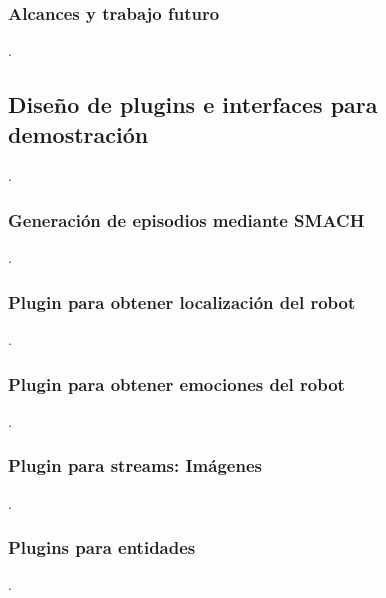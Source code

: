 \subsubsection{Alcances y trabajo futuro}
 .


\subsection{Diseño de plugins e interfaces para demostración}
 .

\subsubsection{Generación de episodios mediante SMACH}
 .

\subsubsection{Plugin para obtener localización del robot}
 .

\subsubsection{Plugin para obtener emociones del robot}
 .

\subsubsection{Plugin para streams: Imágenes}
 .

\subsubsection{Plugins para entidades}
 .

